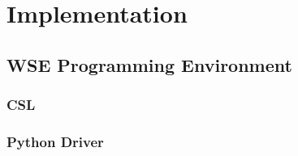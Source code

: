 
\chapter{Implementation}\label{chapter:implementation}
\section{WSE Programming Environment}
\subsection{CSL}
\subsection{Python Driver}